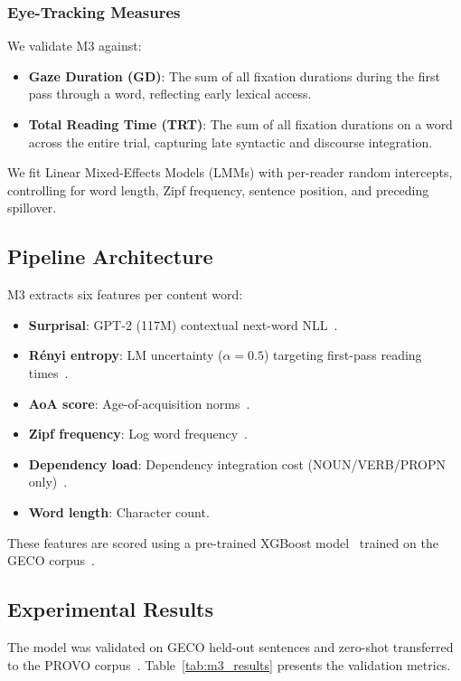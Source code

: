 \documentclass[sigconf]{acmart}
\begin{document}
\subsubsection{Eye-Tracking Measures}
We validate M3 against:
\begin{itemize}
    \item \textbf{Gaze Duration (GD)}: The sum of all fixation durations during the first pass through a word, reflecting early lexical access.
    \item \textbf{Total Reading Time (TRT)}: The sum of all fixation durations on a word across the entire trial, capturing late syntactic and discourse integration.
\end{itemize}
We fit Linear Mixed-Effects Models (LMMs) with per-reader random intercepts, controlling for word length, Zipf frequency, sentence position, and preceding spillover.

\subsection{Pipeline Architecture}
M3 extracts six features per content word:
\begin{itemize}
    \item \textbf{Surprisal}: GPT-2 (117M) contextual next-word NLL~\cite{radford2019language}.
    \item \textbf{Rényi entropy}: LM uncertainty ($\alpha = 0.5$) targeting first-pass reading times~\cite{pimentel2023effect}.
    \item \textbf{AoA score}: Age-of-acquisition norms~\cite{kuperman2012age}.
    \item \textbf{Zipf frequency}: Log word frequency~\cite{brysbaert2009moving}.
    \item \textbf{Dependency load}: Dependency integration cost (NOUN/VERB/PROPN only)~\cite{gibson1998linguistic}.
    \item \textbf{Word length}: Character count.
\end{itemize}
These features are scored using a pre-trained XGBoost model~\cite{chen2016xgboost} trained on the GECO corpus~\cite{cop2017presenting}.

\subsection{Experimental Results}
The model was validated on GECO held-out sentences and zero-shot transferred to the PROVO corpus~\cite{luke2018provo}.
Table~\ref{tab:m3_results} presents the validation metrics.
\end{document}
